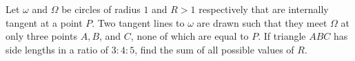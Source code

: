 Let $\omega$ and $\Omega$ be circles of radius $1$ and $R>1$ respectively that are internally tangent at a point $P$. Two tangent lines to $\omega$ are drawn such that they meet $\Omega$ at only three points $A, B$, and $C$, none of which are equal to $P$. If triangle $A B C$ has side lengths in a ratio of $3: 4: 5$, find the sum of all possible values of $R$.